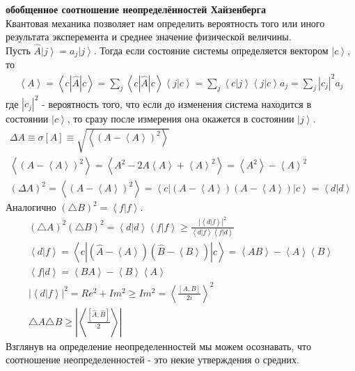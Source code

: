 \documentclass[__main__.tex]{subfiles}
\begin{document}
\textbf{обобщенное соотношение неопределённостей Хайзенберга}\\
Квантовая механика позволяет нам определить вероятность того или иного результата эксперемента и среднее значение физической величины.\\
Пусть $\hat{A}\left|j\right> = a_j \left|j\right>$. Тогда если состояние системы определяется вектором $\left|c\right>$, то\\
\begin{gather}
    \left<A\right> = \left<c|\hat{A}|c\right> = \sum_j \left<c|\hat{A}|c\right>\left<j|c\right> = \sum_j \left<c|j\right>\left<j|c\right>a_j = \sum_j |c_j|^2 a_j
\end{gather}
где $|c_j|^2$ - вероятность того, что если до изменения система находится в состоянии $\left|c\right>$, то сразу после измерения она окажется в состоянии $\left|j\right>$.\\
\begin{gather}
    \Delta{A}\equiv \sigma[A] \equiv \sqrt{\left<(A-\left<A\right>)^2\right>}\\
    \left<(A-\left<A\right>)^2\right> = \left<A^2-2A\left<A\right>+\left<A\right>^2\right> = \left<A^2\right> - \left<A\right>^2\\
    (\Delta{A})^2 = \left<(A-\left<A\right>)^2\right> = \left< c|(A-\left<A\right>)(A-\left<A\right>)|c\right> = \left<d|d\right>
\end{gather}
Аналогично $(\triangle B)^2 = \left<f|f\right>$.\\
\begin{gather}
    (\triangle A)^2(\triangle B)^2
    =
    \left<d|d\right>\left<f|f\right> \geq \frac{|\left<d|f\right>|^2}{\left<d|f\right>\left<f|d\right>}
    \\
    \left<d|f\right>
    =
    \left<c|(\hat{A}-\left<A\right>)(\hat{B} - \left<B\right>)|c\right> = \left<AB\right> - \left< A\right> \left< B\right>
    \\
    \left<f|d\right>
    =
    \left<BA\right> - \left<B\right>\left<A\right>
    \\
    |\left<d|f\right>|^2
    =
    Re^2+Im^2 \geq Im^2 = \left<\frac{[A,B]}{2i}\right>^2
    \\
    \triangle A\triangle B \geq \left|\left<\frac{[\hat{A},\hat{B}]}{2}\right>\right|
\end{gather}
Взглянув на определение неопределенностей мы можем осознавать, что соотношение неопределенностей - это некие утверждения о средних.\\
\end{document}
